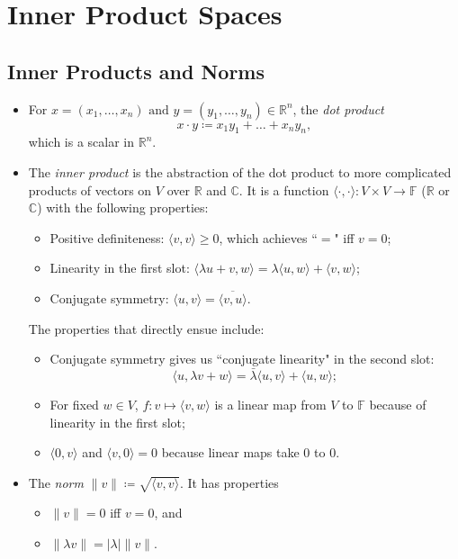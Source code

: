 \documentclass{article}
\newcommand{\R}{\mathbb{R}}
\newcommand{\C}{\mathbb{C}}
\newcommand{\F}{\mathbb{F}}
\begin{document}
\section{Inner Product Spaces}
\subsection{Inner Products and Norms}
\begin{itemize}
    \item For $x=(x_1,\dots,x_n) \text{ and } y=(y_1,\dots,y_n) \in \R^n$, the \textit{dot product} $$x \cdot y \coloneqq x_1y_1+\dots+x_ny_n,$$ which is a scalar in $\R^n$.
    \item The \textit{inner product} is the abstraction of the dot product to more complicated products of vectors on $V$ over $\R$ and $\C$. It is a function $\langle \cdot,\cdot \rangle: V \times V \to \F$ ($\R$ or $\C$) with the following properties:
    \begin{itemize}
        \item Positive definiteness: $\langle v,v \rangle \geq 0$, which achieves ``$=$" iff $v = 0$;
        \item Linearity in the first slot: $\langle \lambda u+v,w \rangle = \lambda \langle u,w \rangle + \langle v,w \rangle$;
        \item Conjugate symmetry: $\langle u,v \rangle = \overline{\langle v,u \rangle}$.
    \end{itemize}
    The properties that directly ensue include:
    \begin{itemize}
        \item Conjugate symmetry gives us ``conjugate linearity" in the second slot: $$\langle u, \lambda v+w \rangle = \bar{\lambda} \langle u, v \rangle + \langle u,w \rangle;$$
        \item For fixed $w \in V$, $f: v \mapsto \langle v,w \rangle$ is a linear map from $V$ to $\F$ because of linearity in the first slot;
        \item $\langle 0,v \rangle$ and $\langle v,0 \rangle = 0$ because linear maps take 0 to 0.
    \end{itemize}
    \item The \textit{norm} $\|v\| \coloneqq \sqrt{\langle v,v \rangle}.$ It has properties
    \begin{itemize}
        \item $\|v\| = 0$ iff $v = 0$, and 
        \item $\|\lambda v\| = |\lambda| \|v\|$.
    \end{itemize}

\end{itemize}
\end{document}
